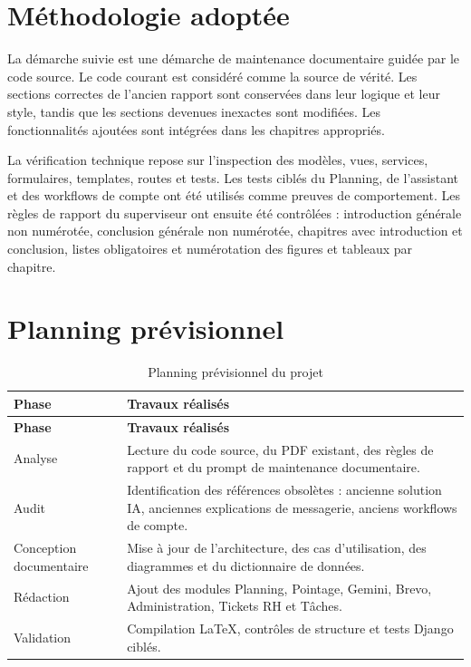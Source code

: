 \documentclass[12pt,a4paper]{report}
\begin{document}
\section{Méthodologie adoptée}
La démarche suivie est une démarche de maintenance documentaire guidée par le code source. Le code courant est considéré comme la source de vérité. Les sections correctes de l'ancien rapport sont conservées dans leur logique et leur style, tandis que les sections devenues inexactes sont modifiées. Les fonctionnalités ajoutées sont intégrées dans les chapitres appropriés.

La vérification technique repose sur l'inspection des modèles, vues, services, formulaires, templates, routes et tests. Les tests ciblés du Planning, de l'assistant et des workflows de compte ont été utilisés comme preuves de comportement. Les règles de rapport du superviseur ont ensuite été contrôlées : introduction générale non numérotée, conclusion générale non numérotée, chapitres avec introduction et conclusion, listes obligatoires et numérotation des figures et tableaux par chapitre.

\section{Planning prévisionnel}

\begin{longtable}{>{\raggedright\arraybackslash}p{4cm}>{\raggedright\arraybackslash}p{10cm}}
\caption{Planning prévisionnel du projet}\label{tab:planning-previsionnel}\\
\toprule
\textbf{Phase} & \textbf{Travaux réalisés} \\
\midrule
\endfirsthead
\toprule
\textbf{Phase} & \textbf{Travaux réalisés} \\
\midrule
\endhead
Analyse & Lecture du code source, du PDF existant, des règles de rapport et du prompt de maintenance documentaire. \\
Audit & Identification des références obsolètes : ancienne solution IA, anciennes explications de messagerie, anciens workflows de compte. \\
Conception documentaire & Mise à jour de l'architecture, des cas d'utilisation, des diagrammes et du dictionnaire de données. \\
Rédaction & Ajout des modules Planning, Pointage, Gemini, Brevo, Administration, Tickets RH et Tâches. \\
Validation & Compilation LaTeX, contrôles de structure et tests Django ciblés. \\
\bottomrule
\end{longtable}
\end{document}
